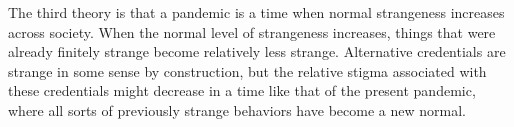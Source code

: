 The third theory is that a pandemic is a time when normal strangeness increases across society.
When the normal level of strangeness increases, things that were already finitely strange become relatively less strange.
Alternative credentials are strange in some sense by construction,
but the relative stigma associated with these credentials might decrease in a time like that of the present pandemic,
where all sorts of previously strange behaviors have become a new normal.




